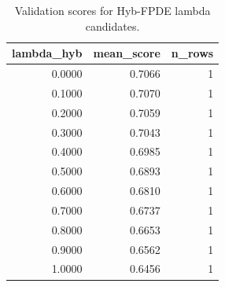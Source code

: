 \begin{table}[t]
\caption{Validation scores for Hyb-FPDE lambda candidates.}
\label{tab:lambda_distribution_computed}
\centering
\begin{tabular}{rrr}
\toprule
lambda\_hyb & mean\_score & n\_rows \\
\midrule
0.0000 & 0.7066 & 1 \\
0.1000 & 0.7070 & 1 \\
0.2000 & 0.7059 & 1 \\
0.3000 & 0.7043 & 1 \\
0.4000 & 0.6985 & 1 \\
0.5000 & 0.6893 & 1 \\
0.6000 & 0.6810 & 1 \\
0.7000 & 0.6737 & 1 \\
0.8000 & 0.6653 & 1 \\
0.9000 & 0.6562 & 1 \\
1.0000 & 0.6456 & 1 \\
\bottomrule
\end{tabular}

\end{table}
